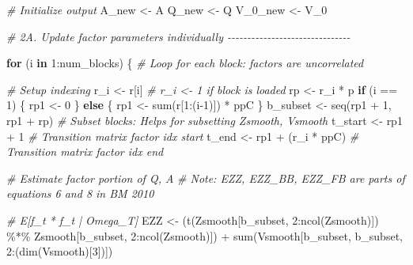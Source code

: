 \documentclass[
]{article}
\newenvironment{Shaded}{\begin{snugshade}}{\end{snugshade}}
\newcommand{\CommentTok}[1]{\textcolor[rgb]{0.56,0.35,0.01}{\textit{#1}}}
\newcommand{\ControlFlowTok}[1]{\textcolor[rgb]{0.13,0.29,0.53}{\textbf{#1}}}
\newcommand{\DecValTok}[1]{\textcolor[rgb]{0.00,0.00,0.81}{#1}}
\newcommand{\FunctionTok}[1]{\textcolor[rgb]{0.00,0.00,0.00}{#1}}
\newcommand{\NormalTok}[1]{#1}
\newcommand{\OtherTok}[1]{\textcolor[rgb]{0.56,0.35,0.01}{#1}}
\newcommand{\SpecialCharTok}[1]{\textcolor[rgb]{0.00,0.00,0.00}{#1}}
\begin{document}
\begin{Shaded}
\begin{Highlighting}[]
  \CommentTok{\# Initialize output}
\NormalTok{  A\_new }\OtherTok{\textless{}{-}}\NormalTok{ A}
\NormalTok{  Q\_new }\OtherTok{\textless{}{-}}\NormalTok{ Q}
\NormalTok{  V\_0\_new }\OtherTok{\textless{}{-}}\NormalTok{ V\_0}
  
  \CommentTok{\# 2A. Update factor parameters individually {-}{-}{-}{-}{-}{-}{-}{-}{-}{-}{-}{-}{-}{-}{-}{-}{-}{-}{-}{-}{-}{-}{-}{-}{-}{-}{-}{-}{-}{-}{-}}
  
  \ControlFlowTok{for}\NormalTok{ (i }\ControlFlowTok{in} \DecValTok{1}\SpecialCharTok{:}\NormalTok{num\_blocks) \{ }\CommentTok{\# Loop for each block: factors are uncorrelated}
    
    \CommentTok{\# Setup indexing}
\NormalTok{    r\_i }\OtherTok{\textless{}{-}}\NormalTok{ r[i] }\CommentTok{\# r\_i \textless{}{-} 1 if block is loaded}
\NormalTok{    rp }\OtherTok{\textless{}{-}}\NormalTok{ r\_i }\SpecialCharTok{*}\NormalTok{ p}
    \ControlFlowTok{if}\NormalTok{ (i }\SpecialCharTok{==} \DecValTok{1}\NormalTok{) \{}
\NormalTok{      rp1 }\OtherTok{\textless{}{-}} \DecValTok{0}
\NormalTok{    \}}
    \ControlFlowTok{else}\NormalTok{ \{}
\NormalTok{      rp1 }\OtherTok{\textless{}{-}} \FunctionTok{sum}\NormalTok{(r[}\DecValTok{1}\SpecialCharTok{:}\NormalTok{(i}\DecValTok{{-}1}\NormalTok{)]) }\SpecialCharTok{*}\NormalTok{ ppC}
\NormalTok{    \}}
\NormalTok{    b\_subset }\OtherTok{\textless{}{-}} \FunctionTok{seq}\NormalTok{(rp1 }\SpecialCharTok{+} \DecValTok{1}\NormalTok{, rp1 }\SpecialCharTok{+}\NormalTok{ rp) }\CommentTok{\# Subset blocks: Helps for subsetting Zsmooth, Vsmooth}
\NormalTok{    t\_start }\OtherTok{\textless{}{-}}\NormalTok{ rp1 }\SpecialCharTok{+} \DecValTok{1} \CommentTok{\# Transition matrix factor idx start}
\NormalTok{    t\_end }\OtherTok{\textless{}{-}}\NormalTok{ rp1 }\SpecialCharTok{+}\NormalTok{ (r\_i }\SpecialCharTok{*}\NormalTok{ ppC) }\CommentTok{\# Transition matrix factor idx end}
    
    \CommentTok{\# Estimate factor portion of Q, A}
    \CommentTok{\# Note: EZZ, EZZ\_BB, EZZ\_FB are parts of equations 6 and 8 in BM 2010}
    
    \CommentTok{\# E[f\_t * f\_t\textquotesingle{} | Omega\_T]}
\NormalTok{    EZZ }\OtherTok{\textless{}{-}}\NormalTok{ (}\FunctionTok{t}\NormalTok{(Zsmooth[b\_subset, }\DecValTok{2}\SpecialCharTok{:}\FunctionTok{ncol}\NormalTok{(Zsmooth)]) }\SpecialCharTok{\%*\%}\NormalTok{ Zsmooth[b\_subset, }\DecValTok{2}\SpecialCharTok{:}\FunctionTok{ncol}\NormalTok{(Zsmooth)]) }\SpecialCharTok{+} \FunctionTok{sum}\NormalTok{(Vsmooth[b\_subset, b\_subset, }\DecValTok{2}\SpecialCharTok{:}\NormalTok{(}\FunctionTok{dim}\NormalTok{(Vsmooth)[}\DecValTok{3}\NormalTok{])])}
    

\end{Highlighting}
\end{Shaded}
\end{document}

